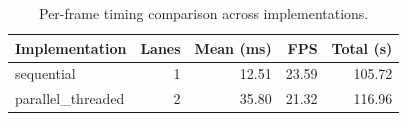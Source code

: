 \begin{table}[t]
\centering
\caption{Per-frame timing comparison across implementations.}
\label{tab:results}
\begin{tabular}{lrrrr}
\hline
\textbf{Implementation} & \textbf{Lanes} & \textbf{Mean (ms)} & \textbf{FPS} & \textbf{Total (s)} \\
\hline
sequential & 1 & 12.51 & 23.59 & 105.72 \\
parallel_threaded & 2 & 35.80 & 21.32 & 116.96 \\
\hline
\end{tabular}
\end{table}
